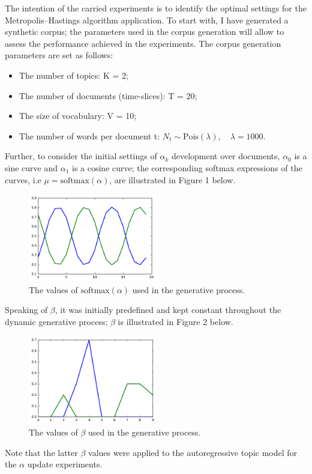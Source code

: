 \documentclass[12pt]{article}
\begin{document}
\par The intention of the carried experiments is to identify the optimal settings for the Metropolis--Hastings algorithm application. 
To start with, I have generated a synthetic corpus; the parameters used in the corpus generation will allow to assess the performance achieved in the experiments. The corpus generation parameters are set as follows:
\begin{itemize}
  \item The number of topics: K = 2;
  \item The number of documents (time-slices): T = 20;
  \item The size of vocabulary: V = 10;
  \item The number of words per document t: $N_t \sim \mbox{Pois}(\lambda),\quad \lambda = 1000$.
\end{itemize}
Further, to consider the initial settings of $\alpha_k$ development over documents, $\alpha_0$ is a sine curve and $\alpha_1$ is a cosine curve; the corresponding softmax expressions of the curves, i.e $\mu = \mbox{softmax}(\alpha)$, are illustrated in Figure 1 below.
\begin{figure}[H]
  \centering
  \includegraphics[width=0.5\textwidth]{alpha_initial}
  \caption{The values of $\mbox{softmax}(\alpha)$ used in the generative process.}
  \label{fig:mu}
\end{figure}
Speaking of $\beta$, it was initially predefined and kept constant throughout the dynamic generative process; $\beta$ is illustrated in Figure 2 below.
\begin{figure}[H]
  \centering
  \includegraphics[width=0.5\textwidth]{beta_initial}
  \caption{The values of $\beta$ used in the generative process.}
  \label{fig:beta}
\end{figure}
Note that the latter $\beta$ values were applied to the autoregressive topic model for the $\alpha$ update experiments.
\end{document}
